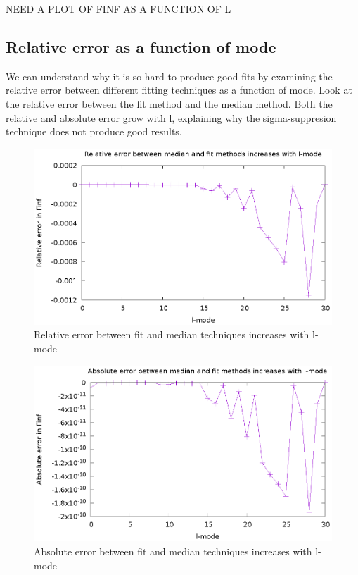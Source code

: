 NEED A PLOT OF FINF AS A FUNCTION OF L


\subsection{Relative error as a function of mode}
We can understand why it is so hard to produce good fits by examining the relative error between different fitting techniques as a function of mode. Look at the relative error between the fit method and the median method. Both the relative and absolute error grow with l, explaining why the sigma-suppresion technique does not produce good results.

\begin{figure}
  \includegraphics{relErrorIncreaseslMode}
  \caption{Relative error between fit and median techniques increases with l-mode}
\end{figure}


\begin{figure}
  \includegraphics{absErrorIncreaseslmode}
  \caption{Absolute error between fit and median techniques increases with l-mode}
\end{figure}


